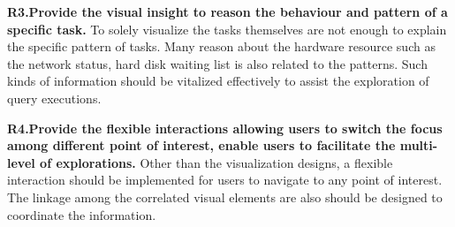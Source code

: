 \textbf{R3.Provide the visual insight to reason the behaviour and pattern of a specific task.}
To solely visualize the tasks themselves are not enough to explain the specific pattern of tasks. Many reason about the hardware resource such as the network status, hard disk waiting list is also related to the patterns. Such kinds of information should be vitalized effectively to assist the exploration of query executions. 

\textbf{R4.Provide the flexible interactions allowing users to switch the focus among different point of interest, enable users to facilitate the multi-level of explorations.}
Other than the visualization designs, a flexible interaction should be implemented for users to navigate to any point of interest. The linkage among the correlated visual elements are also should be designed to coordinate the information.